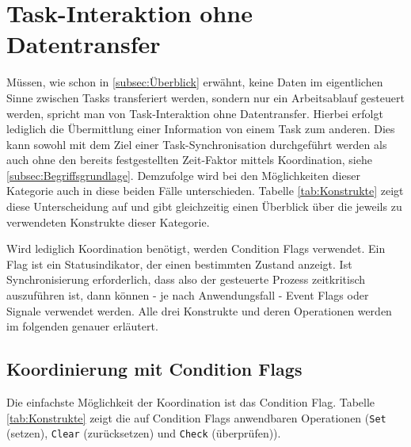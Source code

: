 \documentclass{llncs}
\begin{document}
\section{Task-Interaktion ohne Datentransfer}
Müssen, wie schon in \ref{subsec:Überblick} erwähnt, keine Daten im eigentlichen Sinne zwischen Tasks transferiert werden, sondern nur ein Arbeitsablauf gesteuert werden, spricht man von Task-Interaktion ohne Datentransfer. Hierbei erfolgt lediglich die Übermittlung einer Information von einem Task zum anderen. Dies kann sowohl mit dem Ziel einer Task-Synchronisation durchgeführt werden als auch ohne den bereits festgestellten Zeit-Faktor mittels Koordination, siehe \ref{subsec:Begriffsgrundlage}. Demzufolge wird bei den Möglichkeiten dieser Kategorie auch in diese beiden Fälle unterschieden. Tabelle \ref{tab:Konstrukte} zeigt diese Unterscheidung auf und gibt gleichzeitig einen Überblick über die jeweils zu verwendeten Konstrukte dieser Kategorie.
\begin{table}
	\centering %
	\def\arraystretch{1.5} %
	\setlength{\tabcolsep}{0.5em} %
\caption{\label{tab:Konstrukte} Koordinierungs- und Synchronisationskonstrukte \autocite[vgl.][82]{Cooling2017}}
\end{table}
Wird lediglich Koordination benötigt, werden Condition Flags verwendet. Ein Flag ist ein Statusindikator, der einen bestimmten Zustand anzeigt. Ist Synchronisierung erforderlich, dass also der gesteuerte Prozess zeitkritisch auszuführen ist, dann können - je nach Anwendungsfall - Event Flags oder Signale verwendet werden. Alle drei Konstrukte und deren Operationen werden im folgenden genauer erläutert.

\subsection{Koordinierung mit Condition Flags}
Die einfachste Möglichkeit der Koordination ist das Condition Flag. Tabelle \ref{tab:Konstrukte} zeigt die auf Condition Flags anwendbaren Operationen (\texttt{Set} (setzen), \texttt{Clear} (zurücksetzen) und \texttt{Check} (überprüfen)).
\end{document}
